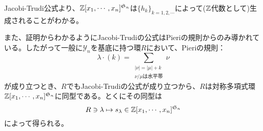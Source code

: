 \documentclass{ltjsreport}
\begin{document}
Jacobi-Trudi公式より、$\mathbb{Z}[x_1,\cdots,x_n]^{\mathfrak{S}_n}$は$\{h_k\}_{k=1,2,\cdots}$によって($\mathbb{Z}$代数として)生成されることがわかる。

また、証明からわかるようにJacobi-Trudiの公式はPieriの規則からのみ導かれている。したがって一般に$\mathcal{Y}_n$を基底に持つ環$R$において、Pieriの規則：
\[
\lambda\cdot {(k)}=\sum_{\substack{|\nu|=|\mu|+k\\\nu/\mu\text{は水平帯}}}\nu
\]
が成り立つとき、$R$でもJacobi-Trudiの公式が成り立つから、$R$は対称多項式環$\mathbb{Z}[x_1,\cdots,x_n]^{\mathfrak{S}_n}$に同型である。とくにその同型は
\[
R\owns \lambda\mapsto s_\lambda\in \mathbb{Z}[x_1,\cdots,x_n]^{\mathfrak{S}_n}   
\]
によって得られる。


    
\end{document}
